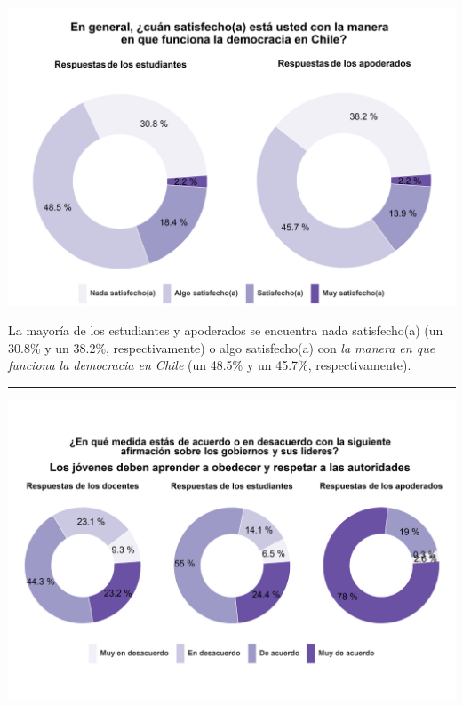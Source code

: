 \documentclass[
  14pt,
]{book}
\let\origfigure\figure
\let\endorigfigure\endfigure
\renewenvironment{figure}[1][2] {
  \expandafter\origfigure\expandafter[H]
} {
  \endorigfigure
}
\begin{document}
\begin{figure}[!ht]

{\centering \includegraphics[width=0.8\linewidth,]{images/graph_dem} 

}

\caption{Satisfacción con la democracia}\label{fig:unnamed-chunk-41}
\end{figure}

La mayoría de los estudiantes y apoderados se encuentra nada satisfecho(a) (un 30.8\% y un 38.2\%, respectivamente) o algo satisfecho(a) con \emph{la manera en que funciona la democracia en Chile} (un 48.5\% y un 45.7\%, respectivamente).

\begin{center}\rule{0.5\linewidth}{0.5pt}\end{center}

\begin{figure}[!ht]

{\centering \includegraphics[width=0.8\linewidth,]{images/graph_aut1} 

}

\caption{Los jóvenes deben aprender a obedecer a las autoridades}\label{fig:unnamed-chunk-42}
\end{figure}
\end{document}
